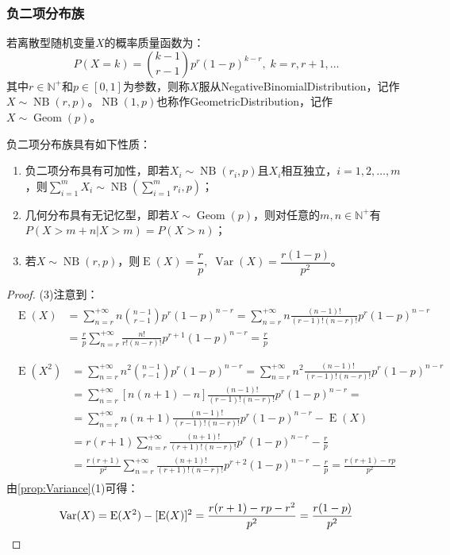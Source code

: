 \subsubsection{负二项分布族}
\begin{definition}
	若离散型随机变量$X$的概率质量函数为：
	\begin{equation*}
		P(X=k)=\binom{k-1}{r-1}p^r(1-p)^{k-r},\;k=r,r+1,\dots
	\end{equation*}
	其中$r\in\mathbb{N}^+$和$p\in[0,1]$为参数，则称$X$服从\gls{NegativeBinomialDistribution}，记作$X\sim\operatorname{NB}(r,p)$。$\operatorname{NB}(1,p)$也称作\gls{GeometricDistribution}，记作$X\sim\operatorname{Geom}(p)$。
\end{definition}
\begin{property}
	负二项分布族具有如下性质：
	\begin{enumerate}
		\item 负二项分布具有可加性，即若$X_i\sim\operatorname{NB}(r_i,p)$且$X_i$相互独立，$i=1,2,\dots,m$，则$\sum\limits_{i=1}^{m}X_i\sim\operatorname{NB}\left(\sum\limits_{i=1}^{m}r_i,p\right)$；
		\item 几何分布具有无记忆型，即若$X\sim\operatorname{Geom}(p)$，则对任意的$m,n\in\mathbb{N}^+$有$P(X>m+n|X>m)=P(X>n)$；
		\item 若$X\sim\operatorname{NB}(r,p)$，则$\operatorname{E}(X)=\dfrac{r}{p},\;\operatorname{Var}(X)=\dfrac{r(1-p)}{p^2}$。
	\end{enumerate}
\end{property}
\begin{proof}
	(3)注意到：
	\begin{gather*}
		\begin{aligned}
			\operatorname{E}(X)&=\sum_{n=r}^{+\infty}n\binom{n-1}{r-1}p^r(1-p)^{n-r}=\sum_{n=r}^{+\infty}n\frac{(n-1)!}{(r-1)!(n-r)!}p^r(1-p)^{n-r} \\
			&=\frac{r}{p}\sum_{n=r}^{+\infty}\frac{n!}{r!(n-r)!}p^{r+1}(1-p)^{n-r}=\frac{r}{p} \\
		\end{aligned} \\
		\begin{aligned}
			\operatorname{E}(X^2)&=\sum_{n=r}^{+\infty}n^2\binom{n-1}{r-1}p^r(1-p)^{n-r}=\sum_{n=r}^{+\infty}n^2\frac{(n-1)!}{(r-1)!(n-r)!}p^r(1-p)^{n-r} \\
			&=\sum_{n=r}^{+\infty}[n(n+1)-n]\frac{(n-1)!}{(r-1)!(n-r)!}p^r(1-p)^{n-r}= \\
			&=\sum_{n=r}^{+\infty}n(n+1)\frac{(n-1)!}{(r-1)!(n-r)!}p^r(1-p)^{n-r}-\operatorname{E}(X) \\
			&=r(r+1)\sum_{n=r}^{+\infty}\frac{(n+1)!}{(r+1)!(n-r)!}p^r(1-p)^{n-r}-\frac{r}{p} \\
			&=\frac{r(r+1)}{p^2}\sum_{n=r}^{+\infty}\frac{(n+1)!}{(r+1)!(n-r)!}p^{r+2}(1-p)^{n-r}-\frac{r}{p}=\frac{r(r+1)-rp}{p^2}
		\end{aligned}
	\end{gather*}
	由\cref{prop:Variance}(1)可得：
	\begin{equation*}
		\operatorname{Var}(X)=\operatorname{E}(X^2)-[\operatorname{E}(X)]^2=\frac{r(r+1)-rp-r^2}{p^2}=\frac{r(1-p)}{p^2}\qedhere
	\end{equation*}
\end{proof}
